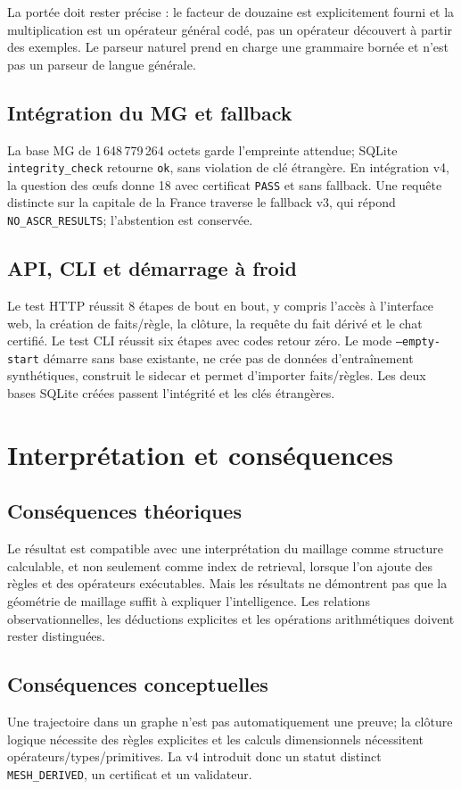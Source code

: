 \documentclass[11pt,a4paper]{book}
\begin{document}
La portée doit rester précise : le facteur de douzaine est explicitement fourni et la multiplication est un opérateur général codé, pas un opérateur découvert à partir des exemples. Le parseur naturel prend en charge une grammaire bornée et n'est pas un parseur de langue générale.

\section{Intégration du MG et fallback}
La base MG de 1\,648\,779\,264 octets garde l'empreinte attendue; SQLite \texttt{integrity\_check} retourne \texttt{ok}, sans violation de clé étrangère. En intégration v4, la question des œufs donne 18 avec certificat \texttt{PASS} et sans fallback. Une requête distincte sur la capitale de la France traverse le fallback v3, qui répond \texttt{NO\_ASCR\_RESULTS}; l'abstention est conservée.

\section{API, CLI et démarrage à froid}
Le test HTTP réussit 8 étapes de bout en bout, y compris l'accès à l'interface web, la création de faits/règle, la clôture, la requête du fait dérivé et le chat certifié. Le test CLI réussit six étapes avec codes retour zéro. Le mode \texttt{--empty-start} démarre sans base existante, ne crée pas de données d'entraînement synthétiques, construit le sidecar et permet d'importer faits/règles. Les deux bases SQLite créées passent l'intégrité et les clés étrangères.

\chapter{Interprétation et conséquences}
\section{Conséquences théoriques}
Le résultat est compatible avec une interprétation du maillage comme structure calculable, et non seulement comme index de retrieval, lorsque l'on ajoute des règles et des opérateurs exécutables. Mais les résultats ne démontrent pas que la géométrie de maillage suffit à expliquer l'intelligence. Les relations observationnelles, les déductions explicites et les opérations arithmétiques doivent rester distinguées.

\section{Conséquences conceptuelles}
Une trajectoire dans un graphe n'est pas automatiquement une preuve; la clôture logique nécessite des règles explicites et les calculs dimensionnels nécessitent opérateurs/types/primitives. La v4 introduit donc un statut distinct \texttt{MESH\_DERIVED}, un certificat et un validateur.
\end{document}
